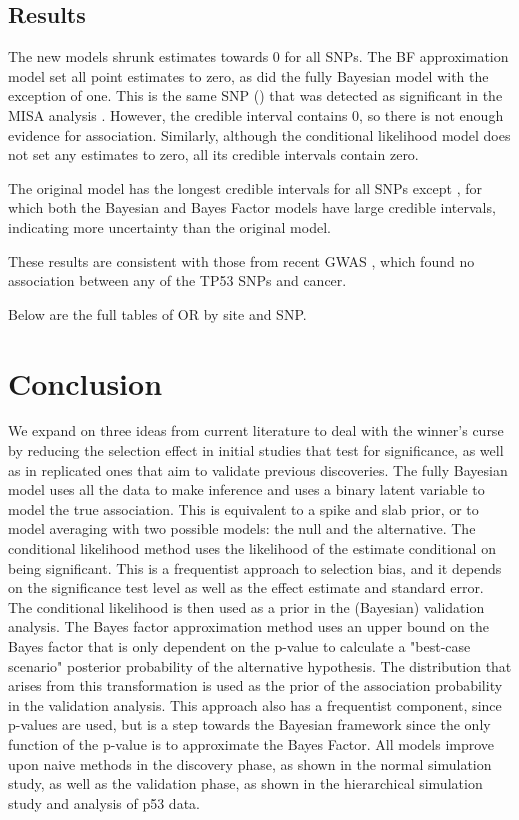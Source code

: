 \documentclass[AMA,STIX1COL]{WileyNJD-v2}\usepackage[]{graphicx}\usepackage[]{color}
\begin{document}
\subsection{Results}





The new models shrunk estimates towards 0 for all SNPs. The BF approximation model set all point estimates to zero, as did the fully Bayesian model with the exception of one. This is the same SNP () 
that was detected as significant in the MISA analysis \cite{schildkraut2010association}. However, the credible interval contains 0, so there is not enough evidence for association. Similarly, although the conditional likelihood model does not set any estimates to zero, all its credible intervals contain zero.


The original model has the longest credible intervals for all SNPs except , 
for which both the Bayesian and Bayes Factor models have large credible intervals, indicating more uncertainty than the original model.

These results are consistent with those from recent GWAS \cite{phelan2017identification}, which found no association between any of the TP53 SNPs and cancer.

Below are the full tables of OR by site and SNP.



\section{Conclusion}\label{sec:conclusion}


We expand on three ideas from current literature to deal with the winner's curse by reducing the selection effect in initial studies that test for significance, as well as in replicated ones that aim to validate previous discoveries. The fully Bayesian model uses all the data to make inference and uses a binary latent variable to model the true association. This is equivalent to a spike and slab prior, or to model averaging with two possible models: the null and the alternative.  The conditional likelihood method uses the likelihood of the estimate conditional on being significant. This is a frequentist approach to selection bias, and it depends on the significance test level as well as the effect estimate and standard error. The conditional likelihood is then used as a prior in the (Bayesian) validation analysis. The Bayes factor approximation method uses an upper bound on the Bayes factor that is only dependent on the p-value to calculate a "best-case scenario" posterior probability of the alternative hypothesis. The distribution that arises from this transformation is used as the prior of the association probability in the validation analysis. This approach also has a frequentist component, since p-values are used, but is a step towards the Bayesian framework since the only function of the p-value is to approximate the Bayes Factor. All models improve upon naive methods in the discovery phase, as shown in the normal simulation study, as well as the validation phase, as shown in the hierarchical simulation study and analysis of p53 data.
\end{document}
